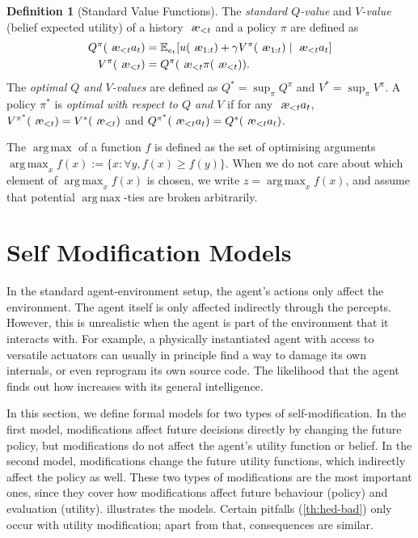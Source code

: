 \documentclass[a4paper]{article}
\DeclareMathOperator*{\argmax}{arg\,max} %
\theoremstyle{definition}
\newtheorem{definition}[theorem]{Definition}
\theoremstyle{remark}
\def\EE{{\mathbb{E}}}  %
\let\aechar\ae %
\renewcommand{\ae}{
\ifmmode\mathchoice{
	\mbox{\textsl{\aechar}}
}{
	\mbox{\textsl{\aechar}}
}{
	\mbox{\scriptsize\textsl{\aechar}}
}{
	\mbox{\scriptsize\textsl{\aechar}}
}\else\aechar\fi%
}                         %
\begin{document}
\begin{definition}[Standard Value Functions]
  \label{def:std-value}
  The \emph{standard $Q$-value} and \emph{$V$-value}
  (belief expected utility) of a history
  $\ae_{<t}$ and a policy $\pi$ are defined as
  \begin{align}
    Q^\pi(\ae_{<t}a_t)\label{eq:std-Q-value-rec}
    &= \EE_{e_t}[u(\ae_{1:t}) + \gamma V^\pi(\ae_{1:t})\mid \ae_{<t}a_t]\\
    V^\pi(\ae_{<t})
    &= Q^\pi(\ae_{<t}\pi(\ae_{<t})).\label{eq:std-V-value-rec}
  \end{align}
  The \emph{optimal $Q$ and $V$-values} are defined as
  $Q^*=\sup_\pi Q^\pi$ and $V^*=\sup_\pi V^\pi$.
  A policy $\pi^*$ is \emph{optimal with respect to $Q$ and $V$}
  if for any $\ae_{<t}a_t$,  $V^{\pi^*}(\ae_{<t})= V^*(\ae_{<t})$
  and $Q^{\pi^*}(\ae_{<t}a_t)= Q^*(\ae_{<t}a_t)$.
\end{definition}

The $\argmax$ of a function $f$ is defined as the set of optimising arguments
$\argmax_x f(x) := \{ x : \forall y, f(x)\geq f(y)\}$.
When we do not care about which element of $\argmax_x f(x)$ is chosen, we write
$z=\argmax_x f(x)$, and assume that potential
$\argmax$-ties are broken arbitrarily.


\section{Self Modification Models}
\label{sec:self-modif-model}

In the standard agent-environment setup,
the agent's actions only affect the environment.
The agent itself is only affected indirectly through the percepts.
However, this is unrealistic when the agent is part of the
environment that it interacts with.
For example, a physically instantiated agent with access to
versatile actuators can usually in principle find a way to
damage its own internals, or even reprogram its own source code.
The likelihood that the agent finds out how increases
with its general intelligence.

In this section, we define formal models for two types of
self-modification.
In the first model, modifications affect future decisions
directly by changing the future policy, but modifications
do not affect the agent's utility function or belief.
In the second model, modifications change the future utility
functions, which indirectly affect the policy as well.
These two types of modifications are the most important ones,
since they cover how modifications affect future behaviour (policy)
and evaluation (utility).  illustrates the models.
Certain pitfalls (\cref{th:hed-bad}) only occur with
utility modification; apart from that, consequences are similar.
\end{document}

